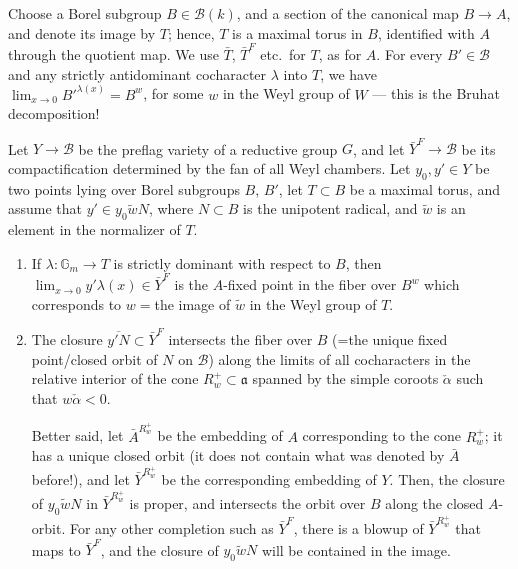 Choose a Borel subgroup $B\in \mathcal B(k)$, and a section of the canonical map $B\to A$, and denote its image by $T$; hence, $T$ is a maximal torus in $B$, identified with $A$ through the quotient map. We use $\bar T$, $\bar T^F$ etc.\ for $T$, as for $A$. For every $B'\in \mathcal B$ and any strictly antidominant cocharacter $\lambda$ into $T$, we have $\lim_{x \to 0} B'^{\lambda(x)} = B^w$, for some $w$ in the Weyl group of $W$ --- this is the Bruhat decomposition!  



\begin{proposition}
\label{proposition-horocycle-closures}
Let $Y\to \mathcal B$ be the preflag variety of a reductive group $G$, and let $\bar Y^F \to \mathcal B$ be its compactification determined by the fan of all Weyl chambers. Let $y_0, y' \in Y$ be two points lying over Borel subgroups $B$, $B'$, let $T\subset B$ be a maximal torus, and assume that $y' \in  y_0 \tilde w N$, where $N\subset B$ is the unipotent radical, and $\tilde w$ is an element in the normalizer of $T$. 
\begin{enumerate}
 \item If $\lambda:\mathbb G_m\to T$ is strictly dominant with respect to $B$, then $\lim_{x\to 0} y' \lambda(x) \in \bar Y^F$ is the $A$-fixed point in the fiber over $B^w$ which corresponds to $w=$the image of $\tilde w$ in the Weyl group of $T$. 

 \item The closure $\overline{y' N}\subset \bar Y^F$ intersects the fiber over $B$ (=the unique fixed point/closed orbit of $N$ on $\mathcal B$) along the limits of all cocharacters in the relative interior of the cone $R_w^+\subset \mathfrak a$ spanned by the simple coroots $\check\alpha$ such that $w\check\alpha <0$. 
 
 Better said, let $\bar A^{R_w^+}$ be the embedding of $A$ corresponding to the cone $R_w^+$; it has a unique closed orbit (it does not contain what was denoted by $\bar A$ before!), and let $\bar Y^{R_w^+}$ be the corresponding embedding of $Y$. Then, the closure of $y_0 \tilde w N$ in $\bar Y^{R_w^+}$ is proper, and intersects the orbit over $B$ along the closed $A$-orbit. For any other completion such as $\bar Y^F$, there is a blowup of $\bar Y^{R_w^+}$ that maps to $\bar Y^F$, and the closure of $y_0 \tilde w N$ will be contained in the image.

\end{enumerate}
\end{proposition}

